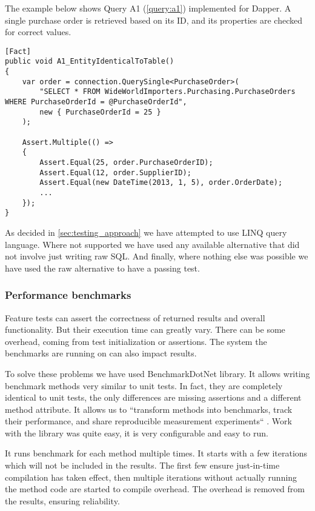 The example below shows Query A1 (\autoref{query:a1}) implemented for Dapper. A single purchase order is retrieved based on its ID, and its properties are checked for correct values. 
\begin{lstlisting}[language=CSharp]
[Fact]
public void A1_EntityIdenticalToTable()
{
    var order = connection.QuerySingle<PurchaseOrder>(
        "SELECT * FROM WideWorldImporters.Purchasing.PurchaseOrders WHERE PurchaseOrderId = @PurchaseOrderId",
        new { PurchaseOrderId = 25 }
    );

    Assert.Multiple(() =>
    {
        Assert.Equal(25, order.PurchaseOrderID);
        Assert.Equal(12, order.SupplierID);
        Assert.Equal(new DateTime(2013, 1, 5), order.OrderDate);
        ...
    });
}
\end{lstlisting}

As decided in \autoref{sec:testing_approach} we have attempted to use LINQ query language. Where not supported we have used any available alternative that did not involve just writing raw SQL. And finally, where nothing else was possible we have used the raw alternative to have a passing test.  

\subsubsection{Performance benchmarks}
Feature tests can assert the correctness of returned results and overall functionality. But their execution time can greatly vary. There can be some overhead, coming from test initialization or assertions. The system the benchmarks are running on can also impact results.

To solve these problems we have used BenchmarkDotNet library\cite{BenchmarkDotNet}. It allows writing benchmark methods very similar to unit tests. In fact, they are completely identical to unit tests, the only differences are missing assertions and a different method attribute. It allows us to ``transform methods into benchmarks, track their performance, and share reproducible measurement experiments`` \cite{BenchmarkDotNet}. Work with the library was quite easy, it is very configurable and easy to run. 

It runs benchmark for each method multiple times. It starts with a few iterations which will not be included in the results. The first few ensure just-in-time compilation has taken effect, then multiple iterations without actually running the method code are started to compile overhead. The overhead is removed from the results, ensuring reliability. 


